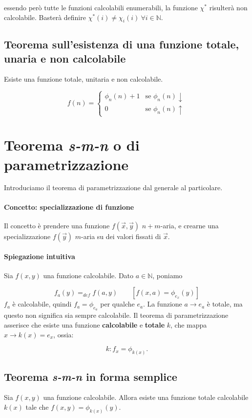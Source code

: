 	essendo però tutte le funzioni calcolabili enumerabili, la funzione $\chi^*$ risulterà non calcolabile. Basterà definire $\chi^*(i) \neq \chi_i(i) \ \forall i \in \mathbb N$.
	
	\subsection{Teorema sull'esistenza di una funzione totale, unaria e non calcolabile}
	
	Esiste una funzione totale, unitaria e non calcolabile.
	
	$$
	f(n)=
	\begin{cases}
	\phi_n(n) +1 &\text{se } \phi_n(n)\downarrow\\
	0 &\text{se } \phi_n(n)\uparrow
	\end{cases}
	$$
	
	\newpage
	
	\section{Teorema \textit{s-m-n }o di parametrizzazione}
	Introduciamo il teorema di parametrizzazione dal generale al particolare.
	
	\paragraph{Concetto: specializzazione di funzione}
	Il concetto è prendere una funzione $f(\vec{x}, \vec{y})$ $n+m$-aria, e crearne una specializzazione $f(\vec{y})$ $m$-aria su dei valori fissati di $\vec{x}$.
	
	\paragraph{Spiegazione intuitiva}
	Sia $f(x,y)$ una funzione calcolabile. Dato $a \in \mathbb{N}$, poniamo 
	
	$$
	f_a(y) =_{def} f(a,y) \qquad \left[ f(x,a) = \phi_{e_x} (y)\right]
	$$
	$f_a$ è calcolabile, quindi $f_a = \phi_{e_a}$ per qualche $e_a$. La funzione $a \to e_a$ è totale, ma questo non significa sia sempre calcolabile. Il teorema di parametrizzazione asserisce che esiste una funzione \textbf{calcolabile} e \textbf{totale} $k$, che mappa $x \to k(x) = e_x$, ossia:
	
	$$
	k:  f_x = \phi_{k(x)}.
	$$
	
	
	\subsection{Teorema \textit{s-m-n } in forma semplice}
	Sia $f(x,y)$ una funzione calcolabile. Allora esiste una funzione totale calcolabile $k(x)$ tale che $f(x,y) = \phi_{k(x)}(y)$.
	
